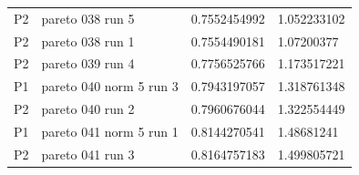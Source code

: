 \begin{tabular}{@{}llll@{}}
P2 & pareto 038 run 5 & 0.7552454992 & 1.052233102 \\
P2 & pareto 038 run 1 & 0.7554490181 & 1.07200377 \\
P2 & pareto 039 run 4 & 0.7756525766 & 1.173517221 \\
P1 & pareto 040 norm 5 run 3 & 0.7943197057 & 1.318761348 \\
P2 & pareto 040 run 2 & 0.7960676044 & 1.322554449 \\
P1 & pareto 041 norm 5 run 1 & 0.8144270541 & 1.48681241 \\
P2 & pareto 041 run 3 & 0.8164757183 & 1.499805721 \\
\bottomrule
\end{tabular}
